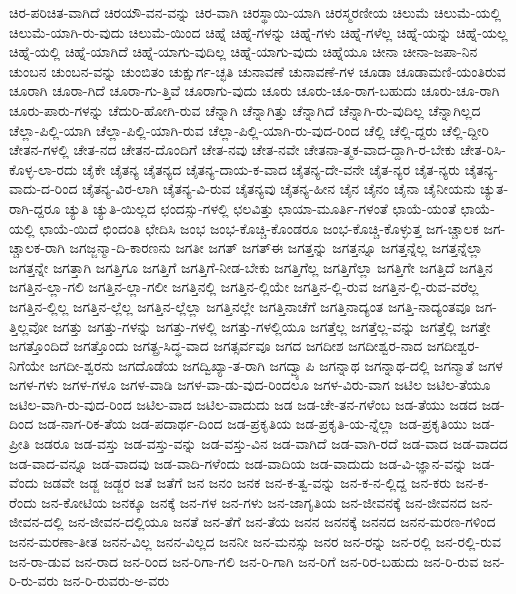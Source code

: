 {ಚಿರ-ಪರಿಚಿತ-ವಾಗಿದೆ
ಚಿರಯೌ-ವನ-ವನ್ನು
ಚಿರ-ವಾಗಿ
ಚಿರಸ್ಥಾಯಿ-ಯಾಗಿ
ಚಿರಸ್ಮರಣೀಯ
ಚಿಲುಮೆ
ಚಿಲುಮೆ-ಯಲ್ಲಿ
ಚಿಲುಮೆ-ಯಾಗಿ-ರು-ವುದು
ಚಿಲುಮೆ-ಯಿಂದ
ಚಿಹ್ನೆ
ಚಿಹ್ನೆ-ಗಳನ್ನು
ಚಿಹ್ನೆ-ಗಳು
ಚಿಹ್ನೆ-ಗಳೆಲ್ಲ
ಚಿಹ್ನೆ-ಯನ್ನು
ಚಿಹ್ನೆ-ಯಲ್ಲ
ಚಿಹ್ನೆ-ಯಲ್ಲಿ
ಚಿಹ್ನೆ-ಯಾಗಿದೆ
ಚಿಹ್ನೆ-ಯಾಗು-ವುದಿಲ್ಲ
ಚಿಹ್ನೆ-ಯಾಗು-ವುದು
ಚಿಹ್ನೆಯೂ
ಚೀನಾ
ಚೀನಾ-ಜಪಾ-ನಿನ
ಚುಂಬನ
ಚುಂಬನ-ವನ್ನು
ಚುಂಬಿತಂ
ಚುಕ್ಷುರ್ಗ-ಚ್ಛತಿ
ಚುನಾವಣೆ
ಚುನಾವಣೆ-ಗಳ
ಚೂಡಾ
ಚೂಡಾಮಣಿ-ಯಂತಿರುವ
ಚೂರಾಗಿ
ಚೂರಾ-ಗಿದೆ
ಚೂರಾ-ಗು-ತ್ತಿವೆ
ಚೂರಾಗು-ವುದು
ಚೂರು
ಚೂರು-ಚೂ-ರಾಗ-ಬಹುದು
ಚೂರು-ಚೂ-ರಾಗಿ
ಚೂರು-ಪಾರು-ಗಳನ್ನು
ಚೆದುರಿ-ಹೋಗಿ-ರುವ
ಚೆನ್ನಾಗಿ
ಚೆನ್ನಾಗಿತ್ತು
ಚೆನ್ನಾಗಿದೆ
ಚೆನ್ನಾಗಿ-ರು-ವುದಿಲ್ಲ
ಚೆನ್ನಾಗಿಲ್ಲದ
ಚೆಲ್ಲಾ-ಪಿಲ್ಲಿ-ಯಾಗಿ
ಚೆಲ್ಲಾ-ಪಿಲ್ಲಿ-ಯಾಗಿ-ರುವ
ಚೆಲ್ಲಾ-ಪಿಲ್ಲಿ-ಯಾಗಿ-ರು-ವುದ-ರಿಂದ
ಚೆಲ್ಲಿ
ಚೆಲ್ಲಿ-ದ್ದರು
ಚೆಲ್ಲಿ-ದ್ದೀರಿ
ಚೇತನ-ಗಳಲ್ಲಿ
ಚೇತ-ನದ
ಚೇತನ-ದೊಂದಿಗೆ
ಚೇತ-ನವು
ಚೇತ-ನವೇ
ಚೇತನಾ-ತ್ಮಕ-ವಾದ-ದ್ದಾಗಿ-ರ-ಬೇಕು
ಚೇತ-ರಿಸಿ-ಕೊಳ್ಳ-ಲಾ-ರದು
ಚೈಕೇ
ಚೈತನ್ಯ
ಚೈತನ್ಯದ
ಚೈತನ್ಯ-ದಾಯ-ಕ-ವಾದ
ಚೈತನ್ಯ-ದೇ-ವನೇ
ಚೈತ-ನ್ಯರ
ಚೈತ-ನ್ಯರು
ಚೈತನ್ಯ-ವಾದು-ದ-ರಿಂದ
ಚೈತನ್ಯ-ವಿರ-ಲಾಗಿ
ಚೈತನ್ಯ-ವಿ-ರುವ
ಚೈತನ್ಯವು
ಚೈತನ್ಯ-ಹೀನ
ಚೈನ
ಚೈನಂ
ಚೈನಾ
ಚೈನೀಯನು
ಚ್ಯುತ-ರಾಗಿ-ದ್ದರೂ
ಚ್ಯುತಿ
ಚ್ಯುತಿ-ಯಿಲ್ಲದ
ಛಂದಸ್ಸು-ಗಳಲ್ಲಿ
ಛಲವಿತ್ತು
ಛಾಯಾ-ಮೂರ್ತಿ-ಗಳಂತೆ
ಛಾಯೆ-ಯಂತೆ
ಛಾಯೆ-ಯಲ್ಲಿ
ಛಾಯೆ-ಯಿದೆ
ಛಿಂದಂತಿ
ಛೇದಿಸಿ
ಜಂಭ
ಜಂಭ-ಕೊಚ್ಚಿ-ಕೊಂಡರೂ
ಜಂಭ-ಕೊಚ್ಚಿ-ಕೊಳ್ಳುತ್ತ
ಜಗ-ಚ್ಚಾಲಕ
ಜಗ-ಚ್ಚಾಲಕ-ರಾಗಿ
ಜಗಜ್ಜನ್ಮಾ-ದಿ-ಕಾರಣನು
ಜಗತೀ
ಜಗತ್
ಜಗತ್ಈ
ಜಗತ್ತನ್ನು
ಜಗತ್ತನ್ನೂ
ಜಗತ್ತನ್ನೆಲ್ಲ
ಜಗತ್ತನ್ನೆಲ್ಲಾ
ಜಗತ್ತನ್ನೇ
ಜಗತ್ತಾಗಿ
ಜಗತ್ತಿಗೂ
ಜಗತ್ತಿಗೆ
ಜಗತ್ತಿಗೆ-ನೀಡ-ಬೇಕು
ಜಗತ್ತಿಗೆಲ್ಲ
ಜಗತ್ತಿಗೆಲ್ಲಾ
ಜಗತ್ತಿಗೇ
ಜಗತ್ತಿದೆ
ಜಗತ್ತಿನ
ಜಗತ್ತಿನ-ಲ್ಲಾ-ಗಲಿ
ಜಗತ್ತಿನ-ಲ್ಲಾ-ಗಲೀ
ಜಗತ್ತಿನಲ್ಲಿ
ಜಗತ್ತಿನ-ಲ್ಲಿಯೇ
ಜಗತ್ತಿನ-ಲ್ಲಿ-ರುವ
ಜಗತ್ತಿನ-ಲ್ಲಿ-ರುವ-ವರೆಲ್ಲ
ಜಗತ್ತಿನ-ಲ್ಲಿಲ್ಲ
ಜಗತ್ತಿನ-ಲ್ಲೆಲ್ಲ
ಜಗತ್ತಿನ-ಲ್ಲೆಲ್ಲಾ
ಜಗತ್ತಿನಲ್ಲೇ
ಜಗತ್ತಿನಾಚೆಗೆ
ಜಗತ್ತಿನಾದ್ಯಂತ
ಜಗತ್ತಿ-ನಾದ್ಯಂತವೂ
ಜಗ-ತ್ತಿಲ್ಲವೋ
ಜಗತ್ತು
ಜಗತ್ತು-ಗಳನ್ನು
ಜಗತ್ತು-ಗಳಲ್ಲಿ
ಜಗತ್ತು-ಗಳಲ್ಲಿಯೂ
ಜಗತ್ತೆಲ್ಲ
ಜಗತ್ತೆಲ್ಲ-ವನ್ನು
ಜಗತ್ತೆಲ್ಲಿ
ಜಗತ್ತೇ
ಜಗತ್ತೊಂದಿದೆ
ಜಗತ್ತೊಂದು
ಜಗತ್ಪ್ರ-ಸಿದ್ಧ-ವಾದ
ಜಗತ್ಸರ್ವವೂ
ಜಗದ
ಜಗದೀಶ
ಜಗದೀಶ್ವರ-ನಾದ
ಜಗದೀಶ್ವರ-ನಿಗೆಯೇ
ಜಗದೀ-ಶ್ವರನು
ಜಗದೊಡೆಯ
ಜಗದ್ವಿಖ್ಯಾ-ತ-ರಾಗಿ
ಜಗದ್ವ್ಯಾಪಿ
ಜಗನ್ನಾಥ
ಜಗನ್ನಾಥ-ದಲ್ಲಿ
ಜಗನ್ಮಾತೆ
ಜಗಳ
ಜಗಳ-ಗಳು
ಜಗಳ-ಗಳೂ
ಜಗಳ-ವಾಡಿ
ಜಗಳ-ವಾ-ಡು-ವುದ-ರಿಂದಲೂ
ಜಗಳ-ವಿರು-ವಾಗ
ಜಟಿಲ
ಜಟಿಲ-ತೆಯೂ
ಜಟಿಲ-ವಾಗಿ-ರು-ವುದ-ರಿಂದ
ಜಟಿಲ-ವಾದ
ಜಟಿಲ-ವಾದುದು
ಜಡ
ಜಡ-ಚೇ-ತನ-ಗಳೆಂಬ
ಜಡ-ತೆಯು
ಜಡದ
ಜಡ-ದಿಂದ
ಜಡ-ನಾಗ-ರಿಕ-ತೆಯ
ಜಡ-ಪದಾರ್ಥ-ದಿಂದ
ಜಡ-ಪ್ರಕೃತಿಯ
ಜಡ-ಪ್ರಕೃತಿ-ಯ-ನ್ನೆಲ್ಲಾ
ಜಡ-ಪ್ರಕೃತಿಯು
ಜಡ-ಪ್ರೀತಿ
ಜಡರೂ
ಜಡ-ವಸ್ತು
ಜಡ-ವಸ್ತು-ವನ್ನು
ಜಡ-ವಸ್ತು-ವಿನ
ಜಡ-ವಾಗಿದೆ
ಜಡ-ವಾಗಿ-ರದೆ
ಜಡ-ವಾದ
ಜಡ-ವಾದದ
ಜಡ-ವಾದ-ವನ್ನೂ
ಜಡ-ವಾದವು
ಜಡ-ವಾದಿ-ಗಳೆಂದು
ಜಡ-ವಾದಿಯ
ಜಡ-ವಾದುದು
ಜಡ-ವಿ-ಜ್ಞಾನ-ವನ್ನು
ಜಡ-ವೆಂದು
ಜಡವೇ
ಜಡ್ಜ
ಜಡ್ಜರ
ಜತೆ
ಜತೆಗೆ
ಜನ
ಜನಂ
ಜನಕ
ಜನ-ಕ-ತ್ವ-ವನ್ನು
ಜನ-ಕ-ನ-ಲ್ಲಿದ್ದ
ಜನ-ಕರು
ಜನ-ಕ-ರೆಂದು
ಜನ-ಕೋಟಿಯ
ಜನಕ್ಕೂ
ಜನಕ್ಕೆ
ಜನ-ಗಳ
ಜನ-ಗಳು
ಜನ-ಜಾಗೃತಿಯ
ಜನ-ಜೀವನಕ್ಕೆ
ಜನ-ಜೀವನದ
ಜನ-ಜೀವನ-ದಲ್ಲಿ
ಜನ-ಜೀವನ-ದಲ್ಲಿಯೂ
ಜನತೆ
ಜನ-ತೆಗೆ
ಜನ-ತೆಯ
ಜನನ
ಜನನಕ್ಕೆ
ಜನನದ
ಜನನ-ಮರಣ-ಗಳಿಂದ
ಜನನ-ಮರಣಾ-ತೀತ
ಜನನ-ವಿಲ್ಲ
ಜನನ-ವಿಲ್ಲದ
ಜನನೀ
ಜನ-ಮನಸ್ಸು
ಜನರ
ಜನ-ರನ್ನು
ಜನ-ರಲ್ಲಿ
ಜನ-ರಲ್ಲಿ-ರುವ
ಜನ-ರಾ-ಡುವ
ಜನ-ರಾದ
ಜನ-ರಿಂದ
ಜನ-ರಿಗಾ-ಗಲಿ
ಜನ-ರಿ-ಗಾಗಿ
ಜನ-ರಿಗೆ
ಜನ-ರಿರ-ಬಹುದು
ಜನ-ರಿ-ರುವ
ಜನ-ರಿ-ರು-ವರು
ಜನ-ರಿ-ರುವರು-ಅ-ವರು
}
